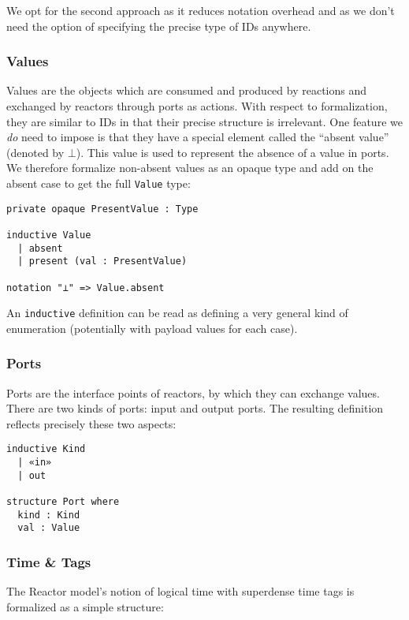 We opt for the second approach as it reduces notation overhead and as we don't need the option of specifying the precise type of IDs anywhere.

\subsubsection{Values}

Values are the objects which are consumed and produced  by reactions and exchanged by reactors through ports as actions.
With respect to formalization, they are similar to IDs in that their precise structure is irrelevant.
One feature we \emph{do} need to impose is that they have a special element called the ``absent value'' (denoted by $\bot$).
This value is used to represent the absence of a value in ports.
We therefore formalize non-absent values as an opaque type and add on the absent case to get the full \lstinline{Value} type:

\begin{lstlisting}
private opaque PresentValue : Type

inductive Value 
  | absent 
  | present (val : PresentValue)

notation "⊥" => Value.absent
\end{lstlisting}

An \lstinline{inductive} definition can be read as defining a very general kind of enumeration (potentially with payload values for each case).

\subsubsection{Ports}

Ports are the interface points of reactors, by which they can exchange values.
There are two kinds of ports: input and output ports.
The resulting definition reflects precisely these two aspects:

\begin{lstlisting}
inductive Kind
  | «in» 
  | out

structure Port where
  kind : Kind
  val : Value
\end{lstlisting}

\subsubsection{Time \& Tags}

The Reactor model's notion of logical time with superdense time tags is formalized as a simple structure:

